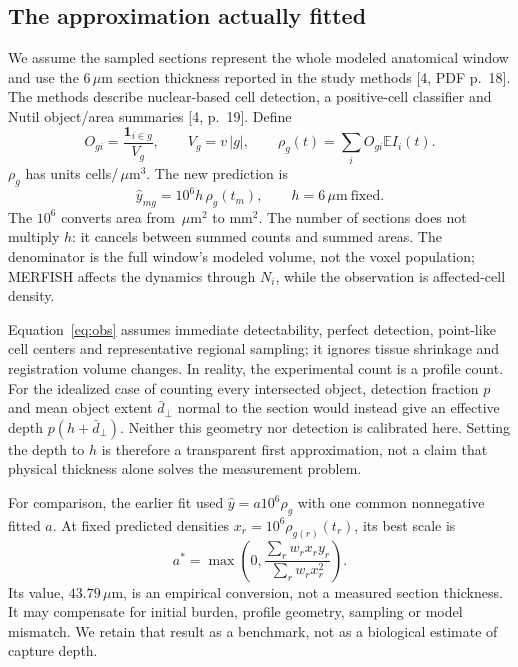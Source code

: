 \documentclass[10pt]{article}
\newcommand{\um}{\,\mu\mathrm{m}}\newcommand{\E}{\mathbb{E}}
\begin{document}
\subsection{The approximation actually fitted}
We assume the sampled sections represent the whole modeled anatomical window and use the $6\um$ section thickness reported in the study methods [4, PDF p.~18]. The methods describe nuclear-based cell detection, a positive-cell classifier and Nutil object/area summaries [4, p.~19]. Define
\begin{equation}
 O_{gi}=\frac{\mathbf{1}_{i\in g}}{V_g},\qquad V_g=v\,|g|,
 \qquad \rho_g(t)=\sum_i O_{gi}\E I_i(t).
\end{equation}
$\rho_g$ has units cells/$\um^3$. The new prediction is
\begin{equation}
 \boxed{\widehat y_{mg}=10^6 h\,\rho_g(t_m),\qquad h=6\um\ \text{fixed}.}\label{eq:obs}
\end{equation}
The $10^6$ converts area from $\um^2$ to mm$^2$. The number of sections does not multiply $h$: it cancels between summed counts and summed areas. The denominator is the full window's modeled volume, not the voxel population; MERFISH affects the dynamics through $N_i$, while the observation is affected-cell density.

Equation~\ref{eq:obs} assumes immediate detectability, perfect detection, point-like cell centers and representative regional sampling; it ignores tissue shrinkage and registration volume changes. In reality, the experimental count is a profile count. For the idealized case of counting every intersected object, detection fraction $p$ and mean object extent $\bar d_\perp$ normal to the section would instead give an effective depth $p(h+\bar d_\perp)$. Neither this geometry nor detection is calibrated here. Setting the depth to $h$ is therefore a transparent first approximation, not a claim that physical thickness alone solves the measurement problem.

For comparison, the earlier fit used $\widehat y=a10^6\rho_g$ with one common nonnegative fitted $a$. At fixed predicted densities $x_r=10^6\rho_{g(r)}(t_r)$, its best scale is
\begin{equation}
 a^*=\max\left(0,\frac{\sum_r w_r x_r y_r}{\sum_r w_r x_r^2}\right).
\end{equation}
Its value, $43.79\um$, is an empirical conversion, not a measured section thickness. It may compensate for initial burden, profile geometry, sampling or model mismatch. We retain that result as a benchmark, not as a biological estimate of capture depth.
\end{document}

